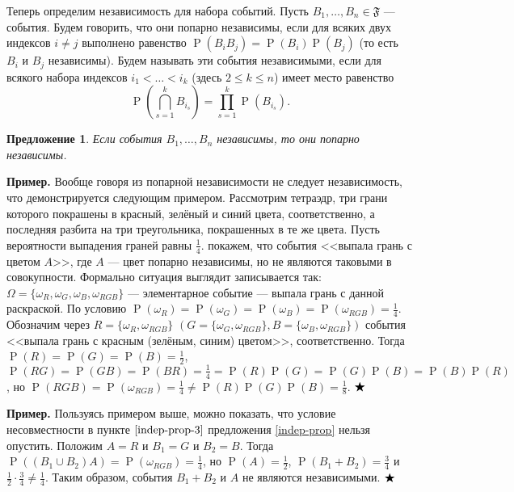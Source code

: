 \documentclass[12pt]{article}
\newtheorem{proposition}[theorem]{Предложение}
\numberwithin{theorem}{section}
\theoremstyle{definition}
\newenvironment{example}{\indent \textbf{Пример.}}{$ \hfill \bigstar $}
\newcommand{\defin}[2]{\hypertarget{#2}{{\color{red} #1}}}
\newcommand{\prob}{\operatorname{P}}
\newcommand{\events}{\mathfrak{F}}
\begin{document}
	Теперь определим независимость для набора событий.
	Пусть $ B_1, \ldots, B_n \in \events $ --- события.
	Будем говорить, что они \defin{попарно независимы}{pairwise-independent}, если для всяких двух индексов $ i \neq j $ выполнено равенство
	$ \prob(B_iB_j) = \prob(B_i)\prob(B_j) $ (то есть $ B_i $ и $ B_j $ независимы). 
	Будем называть эти события \defin{независимыми}{global-independent}, если для всякого набора индексов
	$ i_1 < \ldots < i_k $ (здесь $ 2 \leqslant k \leqslant n $) имеет место равенство
	$$ \prob\left(\bigcap\limits_{s = 1}^{k} B_{i_s}\right) = \prod_{s = 1}^{k} \prob(B_{i_s}). $$
	
	\begin{proposition}
		Если события $ B_1, \ldots, B_n $ независимы, то они попарно независимы.
	\end{proposition}
	
	\begin{example}
		Вообще говоря из попарной независимости не следует независимость, что демонстрируется следующим примером.
		Рассмотрим тетраэдр, три грани которого покрашены в красный, зелёный и синий цвета, соответственно,
		а последняя разбита на три треугольника, покрашенных в те же цвета. 
		Пусть вероятности выпадения граней равны $ \tfrac{1}{4} $. покажем, что события <<выпала грань с цветом $ A $>>,
		где $ A $ --- цвет попарно независимы, но не являются таковыми в совокупности. 
		Формально ситуация выглядит записывается так: $ \Omega = \{\omega_{R}, \omega_{G}, \omega_{B}, \omega_{RGB}\} $
		--- элементарное событие --- выпала грань с данной раскраской.
		По условию $ \prob(\omega_{R}) = \prob(\omega_{G}) = \prob(\omega_{B}) = \prob(\omega_{RGB}) = \tfrac{1}{4} $.
		Обозначим через $ R = \{\omega_R, \omega_{RGB}\} $  $ (G = \{\omega_G, \omega_{RGB}\}, B = \{\omega_B, \omega_{RGB}\}) $
		события <<выпала грань с красным (зелёным, синим) цветом>>, соответственно.
		Тогда $ \prob(R) = \prob(G) = \prob(B) = \tfrac{1}{2} $,
		$ \prob(RG) = \prob(GB) = \prob(BR) = \tfrac{1}{4} = \prob(R)\prob(G) = \prob(G)\prob(B) = \prob(B)\prob(R) $,
		но $ \prob(RGB) = \prob(\omega_{RGB}) = \tfrac{1}{4} \neq \prob(R)\prob(G)\prob(B) = \tfrac{1}{8} $.
	\end{example}

	\begin{example}
		Пользуясь примером выше, можно показать, что условие несовместности в пункте $ \ref{indep-prop-3} $ 
		предложения \ref{indep-prop} нельзя опустить.
		Положим $ A = R $ и $ B_1 = G $ и $ B_2 = B $. Тогда $ \prob((B_1 \cup B_2)A) = \prob(\omega_{RGB}) = \tfrac{1}{4} $,
		но $ \prob(A) = \tfrac{1}{2} $, $ \prob(B_1 + B_2) = \tfrac{3}{4} $ и $ \tfrac{1}{2} \cdot \tfrac{3}{4} \neq \tfrac{1}{4} $.
		Таким образом, события $ B_1 + B_2 $ и $ A $ не являются независимыми.
	\end{example}
	
\end{document}
